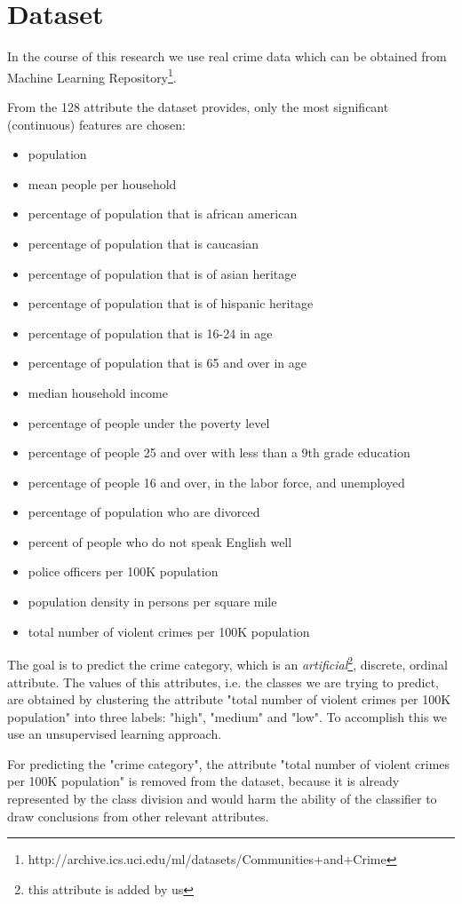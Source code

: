 \section{Dataset}

In the course of this research we use real crime data which can be obtained from Machine Learning Repository\footnote{http://archive.ics.uci.edu/ml/datasets/Communities+and+Crime}.

From the 128 attribute the dataset provides, only the most significant (continuous) features are chosen:

\begin{itemize}
	\setlength{\itemsep}{-2pt}
	\item population 
	\item mean people per household
	\item percentage of population that is african american
	\item percentage of population that is caucasian
	\item percentage of population that is of asian heritage 
	\item percentage of population that is of hispanic heritage
	\item percentage of population that is 16-24 in age
	\item percentage of population that is 65 and over in age 
	\item median household income
	\item percentage of people under the poverty level
	\item percentage of people 25 and over with less than a 9th grade education 
	\item percentage of people 16 and over, in the labor force, and unemployed 
	\item percentage of population who are divorced
	\item percent of people who do not speak English well 
	\item police officers per 100K population
	\item population density in persons per square mile
	\item total number of violent crimes per 100K population 
\end{itemize}

The goal is to predict the crime category, which is an \textit{artificial}\footnote{this attribute is added by us}, discrete, ordinal attribute. The values of this attributes, i.e. the classes we are trying to predict,  are obtained by clustering the attribute "total number of violent crimes per 100K population" into three labels: "high", "medium" and "low". To accomplish this we use an unsupervised learning approach. 

For predicting the "crime category", the attribute "total number of violent crimes per 100K population" is removed from the dataset, because it is already represented by the class division and would harm the ability of the classifier to draw conclusions from other relevant attributes.